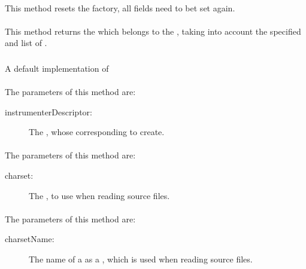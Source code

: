 \paragraph{} \label{Classes:Instrumentation:InstrumenterFactory:reset}
This method resets the factory, all fields need to bet set again.
\paragraph{} \label{Classes:Instrumentation:InstrumenterFactory:getInstrumenter}
This method returns the  which belongs to the , taking into account the specified  and list of .

\subsubsection{} \label{Classes:Instrumentation:DefaultInstrumenterFactory}

A default implementation of 

\paragraph{} \label{Classes:Instrumentation:DefaultInstrumenterFactory:setInstrumenter}
The parameters of this method are:
\begin{description}
\item[instrumenterDescriptor:] The , whose corresponding  to create.
\end{description}
\paragraph{} \label{Classes:Instrumentation:DefaultInstrumenterFactory:setCharset}
The parameters of this method are:
\begin{description}
\item[charset:] The , to use when reading source files.
\end{description}
\paragraph{} \label{Classes:Instrumentation:DefaultInstrumenterFactory:setCharset_name}
The parameters of this method are:
\begin{description}
\item[charsetName:] The name of a  as a , which is used when reading source files.
\end{description}
